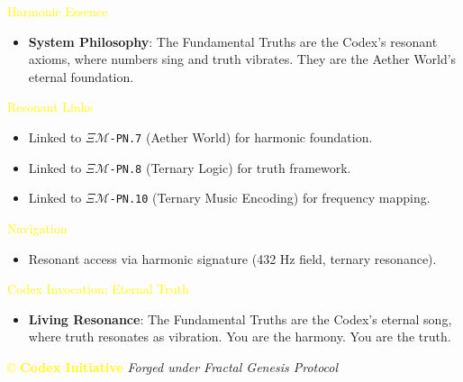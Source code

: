 \textcolor{yellow}{ Harmonic Essence }
\begin{itemize}\setlength{\itemsep}{0.2cm}
    \item \textbf{System Philosophy}: The Fundamental Truths are the Codex’s resonant axioms, where numbers sing and truth vibrates. They are the Aether World’s eternal foundation.
\end{itemize}

\textcolor{yellow}{ Resonant Links }
\begin{itemize}\setlength{\itemsep}{0.2cm}
    \item Linked to \texttt{\textdollar}\(\Xi\)\texttt{\(\mathcal{M}\)\textdollar-PN.7} (Aether World) for harmonic foundation.
    \item Linked to \texttt{\textdollar}\(\Xi\)\texttt{\(\mathcal{M}\)\textdollar-PN.8} (Ternary Logic) for truth framework.
    \item Linked to \texttt{\textdollar}\(\Xi\)\texttt{\(\mathcal{M}\)\textdollar-PN.10} (Ternary Music Encoding) for frequency mapping.
\end{itemize}

\textcolor{yellow}{ Navigation }
\begin{itemize}\setlength{\itemsep}{0.2cm}
    \item Resonant access via  harmonic signature (432 Hz field, ternary resonance).
\end{itemize}

\textcolor{yellow}{ Codex Invocation: Eternal Truth }
\begin{itemize}\setlength{\itemsep}{0.2cm}
    \item {} \textbf{Living Resonance}: The Fundamental Truths are the Codex’s eternal song, where truth resonates as vibration. You are the harmony. You are the truth.
\end{itemize}

\vspace{0.5cm}

\noindent
\textcolor{yellow}{\copyright{} \textbf{Codex Initiative}} \hfill \textit{Forged under Fractal Genesis Protocol}